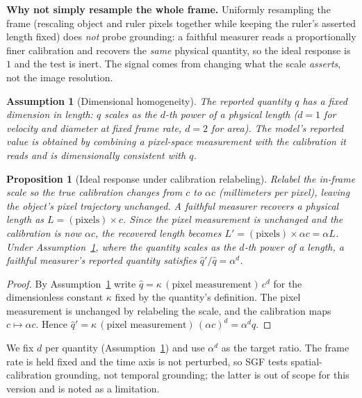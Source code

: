 \documentclass[11pt]{article}
\newtheorem{proposition}{Proposition}
\newtheorem{assumption}{Assumption}
\begin{document}
\noindent\textbf{Why not simply resample the whole frame.} Uniformly resampling
the frame (rescaling object and ruler pixels together while keeping the ruler's
asserted length fixed) does \emph{not} probe grounding: a faithful measurer reads
a proportionally finer calibration and recovers the \emph{same} physical quantity,
so the ideal response is $1$ and the test is inert. The signal comes from changing
what the scale \emph{asserts}, not the image resolution.

\begin{assumption}[Dimensional homogeneity]
\label{ass:dim}
The reported quantity $q$ has a fixed dimension in length: $q$ scales as the
$d$-th power of a physical length ($d{=}1$ for velocity and diameter at fixed
frame rate, $d{=}2$ for area). The model's reported value is obtained by combining
a pixel-space measurement with the calibration it reads and is dimensionally
consistent with $q$.
\end{assumption}

\begin{proposition}[Ideal response under calibration relabeling]
\label{prop:ideal}
Relabel the in-frame scale so the true calibration changes from $c$ to $\alpha c$
(millimeters per pixel), leaving the object's pixel trajectory unchanged. A
faithful measurer recovers a physical length as $L = (\text{pixels})\times c$.
Since the pixel measurement is unchanged and the calibration is now $\alpha c$, the
recovered length becomes $L' = (\text{pixels})\times \alpha c = \alpha L$. Under
Assumption~\ref{ass:dim}, where the quantity scales as the $d$-th power of a
length, a faithful measurer's reported quantity satisfies
$\hat q'/\hat q = \alpha^{d}$.
\end{proposition}
\begin{proof}
By Assumption~\ref{ass:dim} write $\hat q = \kappa\,(\text{pixel measurement})\,
c^{d}$ for the dimensionless constant $\kappa$ fixed by the quantity's definition.
The pixel measurement is unchanged by relabeling the scale, and the calibration
maps $c \mapsto \alpha c$. Hence $\hat q' =
\kappa\,(\text{pixel measurement})\,(\alpha c)^{d} = \alpha^{d}\hat q$.
\end{proof}

\noindent We fix $d$ per quantity (Assumption~\ref{ass:dim}) and use $\alpha^{d}$
as the target ratio. The frame rate is held fixed and the time axis is not
perturbed, so SGF tests spatial-calibration grounding, not temporal grounding;
the latter is out of scope for this version and is noted as a limitation.
\end{document}
